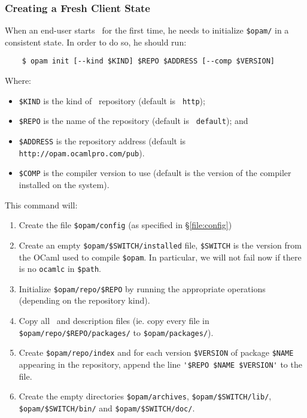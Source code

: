 \documentclass[a4paper,10pt]{article}
\begin{document}
\subsubsection{Creating a Fresh Client State}
\label{opam-init}

When an end-user starts \OPAM\ for the first time, he needs to
initialize \verb+$opam/+ in a consistent state. In order to do so, he
should run:

\begin{verbatim}
    $ opam init [--kind $KIND] $REPO $ADDRESS [--comp $VERSION]
\end{verbatim}

Where:
\begin{itemize}
\item \verb+$KIND+ is the kind of \OPAM\ repository (default is {\tt
  http});
\item \verb+$REPO+ is the name of the repository (default is {\tt
  default}); and
\item \verb+$ADDRESS+ is the repository address (default is
  \verb+http://opam.ocamlpro.com/pub+).
\item \verb+$COMP+ is the compiler version to use (default is the
  version of the compiler installed on the system).
\end{itemize}

This command will:

\begin{enumerate}

\item Create the file \verb+$opam/config+ (as specified in
  \S\ref{file:config})

\item Create an empty \verb+$opam/$SWITCH/installed+ file,
  \verb+$SWITCH+ %
  is the version from the OCaml used to compile \verb+$opam+.
  In particular, we will not fail now
  if there is no \verb+ocamlc+ in \verb+$path+.

\item Initialize \verb+$opam/repo/$REPO+ by running the
  appropriate operations (depending on the repository kind).

\item Copy all \OPAM\ and description files (ie. copy
  every file in \verb+$opam/repo/$REPO/packages/+ to
  \verb+$opam/packages/+).

\item Create \verb+$opam/repo/index+ and for each version
  \verb+$VERSION+ of package \verb+$NAME+ appearing in the repository,
  append the line \verb+'$REPO $NAME $VERSION'+ to the file.

\item Create the empty directories \verb+$opam/archives+,
  \verb+$opam/$SWITCH/lib/+, \verb+$opam/$SWITCH/bin/+ and \verb+$opam/$SWITCH/doc/+.

\end{enumerate}
\end{document}
